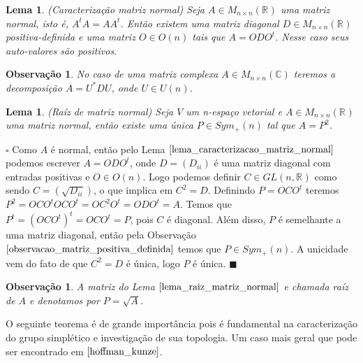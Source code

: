 \documentclass[12pt]{book}
\newtheorem{lema}[teorema]{Lema}
\newtheorem{observacao}[teorema]{Observação}
\newenvironment{prova}[1]{$\square$ #1}{\hfill$\blacksquare$}
\newcommand{\generalgroup}[2]{GL(#1, #2)}
\newcommand{\generalgroupreal}[1]{\generalgroup{#1}{\real{}}}
\newcommand{\matrizortogonal}[1]{O(#1)}
\newcommand{\matrizquadreal}[1]{M_{#1 \times #1}(\real{})}
\newcommand{\matrizsimetricapositiva}[1]{Sym_{+}(#1)}
\newcommand{\matrizunitaria}[1]{U(#1)}
\newcommand{\real}[1]{\mathbb{R}^{#1}}
\begin{document}
	\begin{lema}\label{lema_caracterizacao_matriz_normal}
		(Caracterização matriz normal) Seja $A\in \matrizquadreal{n}$ uma matriz normal, isto é, $A^{t}A=AA^{t}$. Então existem uma matriz diagonal $D \in \matrizquadreal{n}$ positiva-definida e uma matriz $O\in \matrizortogonal{n}$ tais que $A=ODO^{t}$. Nesse caso seus auto-valores são positivos. 
	\end{lema}
	
	\begin{observacao}\label{observacao_caracterizacao_matriz_normal}
		No caso de uma matriz complexa $A \in M_{n\times n}(\mathbb{C})$ teremos a decomposição $A=U^{*}DU$, onde $U \in \matrizunitaria{n}$.
	\end{observacao}
	
	\begin{lema}\label{lema_raiz_matriz_normal}
		(Raíz de matriz normal) Seja $V$ um n-espaço vetorial e $A\in \matrizquadreal{n}$ uma matriz normal, então existe uma única $P\in \matrizsimetricapositiva{n}$ tal que $A=P^{2}$. 
	\end{lema}
	\begin{prova}
		Como $A$ é normal, então pelo Lema $\ref{lema_caracterizacao_matriz_normal}$ podemos escrever $A=ODO^{t}$, onde $D=(D_{ii})$ é uma matriz diagonal com entradas positivas e $O\in \matrizortogonal{n}$. Logo podemos definir $C \in \generalgroupreal{n}$ como sendo $C = (\sqrt{D_{ii}})$, o que implica em $C^{2} = D$. Definindo $P = OCO^{t}$ teremos $P^{2} = OCO^{t}OCO^{t} = OC^{2}O^{t} = ODO^{t}=A$. Temos que $P^{t} = (OCO^{t})^{t} = OCO^{t} = P$, pois $C$ é diagonal. Além disso, $P$ é semelhante a uma matriz diagonal, então pela Observação $\ref{observacao_matriz_positiva_definida}$ temos que $P \in \matrizsimetricapositiva{n}$. A unicidade vem do fato de que $C^{2} = D$ é única, logo $P$ é única.
	\end{prova}
	
	\begin{observacao}\label{observacao_raiz_matriz_normal}
		A matriz do Lema $\ref{lema_raiz_matriz_normal}$ e chamada raíz de $A$ e denotamos por $P=\sqrt{A}$.
	\end{observacao}
	
	O seguinte teorema é de grande importância pois é fundamental na caracterização do grupo simplético e investigação de sua topologia. Um caso mais geral que pode ser encontrado em $\cite{hoffman_kunze}$.
	
\end{document}
